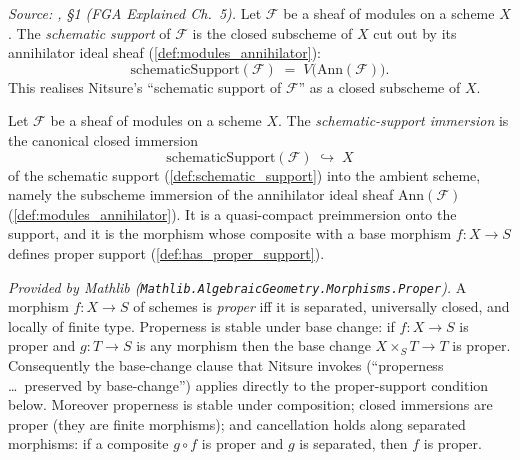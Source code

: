 \begin{definition}\leanok
  \label{def:schematic_support}
  \textit{Source: \cite{nitsure-hilbert-quot}, \S 1 (FGA Explained Ch.~5).}
  Let \(\mathcal{F}\) be a sheaf of modules on a scheme \(X\). The
  \emph{schematic support} of \(\mathcal{F}\) is the closed subscheme of \(X\)
  cut out by its annihilator ideal sheaf (\cref{def:modules_annihilator}):
  \[
    \mathrm{schematicSupport}(\mathcal{F})
    \;=\; V\bigl(\mathrm{Ann}(\mathcal{F})\bigr).
  \]
  This realises Nitsure's ``schematic support of \(\mathcal{F}\)'' as a closed
  subscheme of \(X\).
\end{definition}

\begin{definition}\leanok
  \label{def:schematic_support_immersion}
  Let \(\mathcal{F}\) be a sheaf of modules on a scheme \(X\). The
  \emph{schematic-support immersion} is the canonical closed immersion
  \[
    \mathrm{schematicSupport}(\mathcal{F}) \;\hookrightarrow\; X
  \]
  of the schematic support (\cref{def:schematic_support}) into the ambient
  scheme, namely the subscheme immersion of the annihilator ideal sheaf
  \(\mathrm{Ann}(\mathcal{F})\) (\cref{def:modules_annihilator}). It is a
  quasi-compact preimmersion onto the support, and it is the morphism whose
  composite with a base morphism \(f : X \to S\) defines proper support
  (\cref{def:has_proper_support}).
\end{definition}

\begin{lemma}
  \label{lem:isProper_mathlib}
  \mathlibok
  \textit{Provided by Mathlib
  (\texttt{Mathlib.AlgebraicGeometry.Morphisms.Proper}).}
  A morphism \(f : X \to S\) of schemes is \emph{proper} iff it is separated,
  universally closed, and locally of finite type. Properness is stable under base
  change: if \(f : X \to S\) is proper and \(g : T \to S\) is any morphism then
  the base change \(X \times_S T \to T\) is proper. Consequently the base-change
  clause that Nitsure invokes (``properness \ldots\ preserved by base-change'')
  applies directly to the proper-support condition below.  Moreover properness
  is stable under composition; closed immersions are proper (they are finite
  morphisms); and cancellation holds along separated morphisms: if a composite
  \(g \circ f\) is proper and \(g\) is separated, then \(f\) is proper.
\end{lemma}

